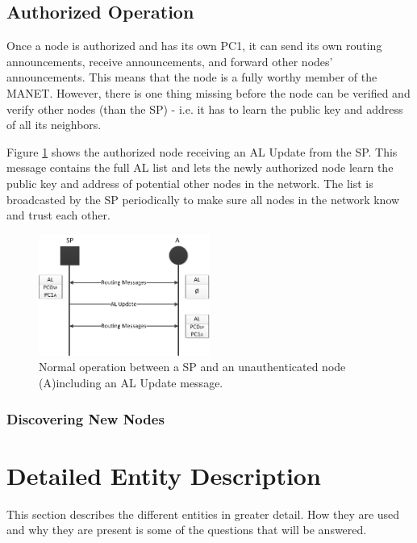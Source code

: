 \subsection{Authorized Operation}
Once a node is authorized and has its own \ac{PC1}, it can send its own routing
announcements, receive announcements, and forward other nodes' announcements.
This means that the node is a fully worthy member of the MANET. However, there
is one thing missing before the node can be verified and verify other nodes
(than the \ac{SP}) - i.e. it has to learn the public key and address of all its
neighbors.

Figure \ref{fig:node_states_authorized} shows the authorized node receiving
an \ac{AL} Update from the \ac{SP}. This message contains the full \ac{AL} list
and lets the newly authorized node learn the public key and address of potential
other nodes in the network. The list is broadcasted by the \ac{SP} periodically
to make sure all nodes in the network know and trust each other.

\begin{figure}[h]
	\centering
  	\includegraphics[width=0.5\textwidth]{images/node_states_authorized.png}
  	\caption{Normal operation between a \acf{SP} and an unauthenticated node
  	(A)including an \ac{AL} Update message.}
	\label{fig:node_states_authorized}
\end{figure}



\subsubsection*{Discovering New Nodes}


\section{Detailed Entity Description}
This section describes the different entities in greater detail. How they are
used and why they are present is some of the questions that will be answered.

